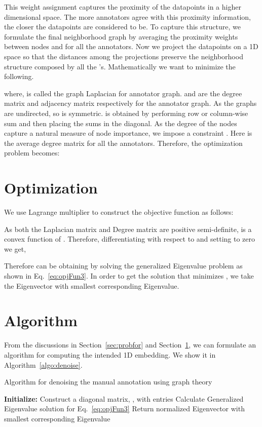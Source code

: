 \documentclass{article} \usepackage{nips14submit_e,times}
\begin{document}
This weight assignment captures the proximity of the datapoints in a higher dimensional space. The more annotators agree with this proximity information, the closer the datapoints are considered to be. To capture this structure, we formulate the final neighborhood graph by averaging the proximity weights  between nodes  and  for all the annotators. Now we project the datapoints on a 1D space so that the distances among the projections preserve the neighborhood structure composed by all the 's. Mathematically we want to minimize the following. 

where,  is called the graph Laplacian for  annotator graph.  and  are the degree matrix and adjacency matrix respectively for the  annotator graph. As the graphs are undirected, so  is symmetric.  is obtained by performing row or column-wise sum and then placing the sums in the diagonal. As the degree of the nodes capture a natural measure of node importance, we impose a constraint . Here  is the average degree matrix for all the annotators. Therefore, the optimization problem becomes:


\section{Optimization}\label{sec:opt}
We use Lagrange multiplier to construct the objective function as follows:
 
As both the Laplacian matrix and Degree matrix are positive semi-definite,  is a convex function of . Therefore, differentiating  with respect to  and setting to zero we get,  

Therefore  can be obtaining by solving the generalized Eigenvalue problem as shown in Eq.~\eqref{eq:opjFun3}. In order to get the solution that minimizes , we take the Eigenvector with smallest corresponding Eigenvalue.

\section{Algorithm}
From the discussions in Section~\ref{sec:probfor} and Section~\ref{sec:opt}, we can formulate an algorithm for computing the intended 1D embedding. We show it in Algorithm~\ref{algo:denoise}.
\begin{algorithm}[t]
 \caption{Algorithm for denoising the manual annotation using graph theory}\label{algo:denoise}
  \textbf{Initialize:}\;
  \;
  Construct a diagonal matrix, , with entries \;
  \;
  Calculate Generalized Eigenvalue solution for Eq.~\eqref{eq:opjFun3}\;
  Return normalized Eigenvector with smallest corresponding Eigenvalue\;
\end{algorithm}
\end{document}
